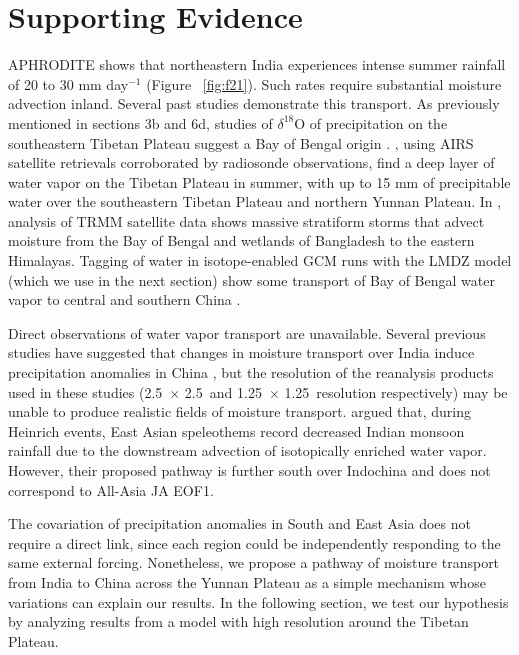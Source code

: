 \section{Supporting Evidence}

	APHRODITE shows that northeastern India experiences intense summer rainfall of 20 to 30 mm day$^{-1}$ (Figure ~\ref{fig:f21}). Such rates require substantial moisture advection inland. Several past studies demonstrate this transport. As previously mentioned in sections 3b and 6d, studies of $\delta^{18}$O of precipitation on the southeastern Tibetan Plateau suggest a Bay of Bengal origin \citep{Yao2009,Gao2011,Yang2011}. \cite{Zhang2013}, using AIRS satellite retrievals corroborated by radiosonde observations, find a deep layer of water vapor on the Tibetan Plateau in summer, with up to 15 mm of precipitable water over the southeastern Tibetan Plateau and northern Yunnan Plateau. In \cite{Medina2010}, analysis of TRMM satellite data shows massive stratiform storms that advect moisture from the Bay of Bengal and wetlands of Bangladesh to the eastern Himalayas. Tagging of water in isotope-enabled GCM runs with the LMDZ model (which we use in the next section) show some transport of Bay of Bengal water vapor to central and southern China \citep{Yao2013}.
	
	Direct observations of water vapor transport are unavailable. Several previous studies have suggested that changes in moisture transport over India induce precipitation anomalies in China \citep{Feng2012,Cao2014}, but the resolution of the reanalysis products used in these studies (2.5\textdegree\ $\times$ 2.5\textdegree\ and 1.25\textdegree\ $\times$ 1.25\textdegree\ resolution respectively) may be unable to produce realistic fields of moisture transport. \cite{Pausata2011} argued that, during Heinrich events, East Asian speleothems record decreased Indian monsoon rainfall due to the downstream advection of isotopically enriched water vapor. However, their proposed pathway is further south over Indochina and does not correspond to All-Asia JA EOF1.	
		
	The covariation of precipitation anomalies in South and East Asia does not require a direct link, since each region could be independently responding to the same external forcing. Nonetheless, we propose a pathway of moisture transport from India to China across the Yunnan Plateau as a simple mechanism whose variations can explain our results.  In the following section, we test our hypothesis by analyzing results from a model with high resolution around the Tibetan Plateau.

